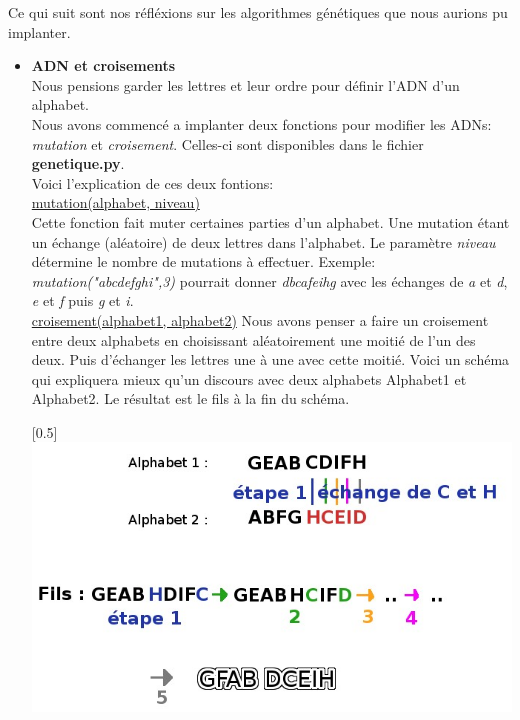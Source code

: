 \documentclass[a4paper, 11pt]{article}
\begin{document}
Ce qui suit sont nos réfléxions sur les algorithmes génétiques que nous aurions
pu implanter.\\
\begin{itemize}
\item \textbf{ADN et croisements}\\
Nous pensions garder les lettres et leur ordre pour définir l'ADN d'un alphabet.\\

Nous avons commencé a implanter deux fonctions pour modifier les ADNs: \textit{mutation} et \textit{croisement}.
Celles-ci sont disponibles dans le fichier \textbf{genetique.py}.\\

Voici l'explication de ces deux fontions:\\

\underline{mutation(alphabet, niveau)}\\
Cette fonction fait muter certaines parties d'un alphabet. Une
mutation étant un échange (aléatoire) de deux lettres dans l'alphabet. Le paramètre
\textit{niveau} détermine le nombre de mutations à effectuer.
Exemple: \textit{mutation("abcdefghi",3)} pourrait donner
\textit{dbcafeihg} avec les échanges de \textit{a} et \textit{d},
\textit{e} et \textit{f} puis \textit{g} et \textit{i}.\\

\underline{croisement(alphabet1, alphabet2)}
Nous avons penser a faire un croisement entre deux alphabets en
choisissant aléatoirement une moitié de l'un des deux. Puis d'échanger
les lettres une à une avec cette moitié. Voici un schéma qui
expliquera mieux qu'un discours avec deux alphabets Alphabet1 et
Alphabet2. Le résultat est le fils à la fin du schéma.
 
\begin{center}
 \scalebox{0.5}[0.5]{\includegraphics{./croisement.jpg}}
\end{center}



\end{itemize}
\end{document}

